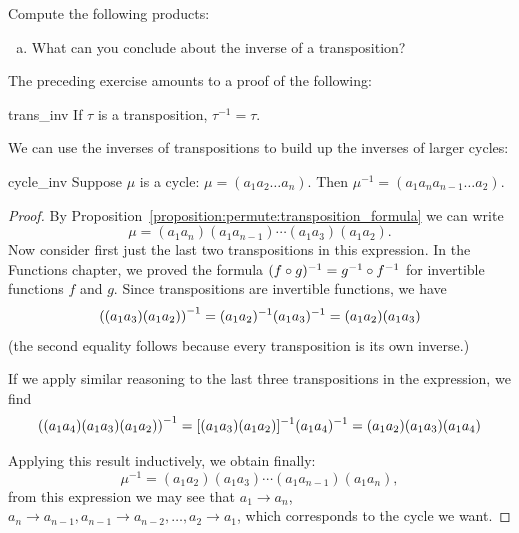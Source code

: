 \begin{exercise}{}
Compute the following products:
\begin{enumerate}[(a)]
\item
What can you conclude about the inverse of a transposition?
\end{enumerate}
\end{exercise}

\noindent
The preceding exercise amounts to a proof of the following:

\begin{prop}{trans_inv}
If $\tau$ is a transposition, $\tau^{-1} = \tau$.
\end{prop}

We can use the inverses of transpositions to build up the inverses of larger cycles:

\begin{prop}{cycle_inv}
Suppose $\mu$ is a cycle: $\mu = (a_1 a_2 \ldots  a_n)$. Then $\mu^{-1} = (a_1 a_n a_{n-1}  \ldots a_2 )$.
\end{prop}

\begin{proof}
By Proposition~\ref{proposition:permute:transposition_formula} we can write 
\[ \mu = (a_1 a_n ) (a_1 a_{n-1} ) \cdots ( a_1 a_3) (a_1 a_2).
\]
Now consider first just the last two transpositions in this expression.
In the Functions chapter, we proved the formula  $(f \circ g)^{-1} = g^{-1} \circ f^{-1}$ for invertible functions $f$ and $g$.
Since transpositions are invertible functions, we have
\[
{\large(}(a_1 a_3)(a_1 a_2){\large)}^{-1} = (a_1 a_2)^{-1} ( a_1 a_3)^{-1} = (a_1 a_2 ) (a_1 a_3 ) \]
(the second equality follows because every transposition is its own inverse.)

If we apply similar reasoning to the last three transpositions in the expression, we find
\[
{\large(}(a_1 a_4)(a_1 a_3)(a_1 a_2){\large)}^{-1} = [(a_1 a_3)(a_1 a_2)]^{-1} ( a_1 a_4)^{-1} = (a_1 a_2 ) (a_1 a_3 ) (a_1 a_4) \]

 Applying this result inductively, we obtain finally: 
\[
\mu^{-1} = (a_1 a_2) ( a_1 a_3) \cdots (a_1 a_{n-1} ) (a_1 a_n ), \]
from this expression we may see that $a_1 \rightarrow a_n$, $a_n \rightarrow a_{n-1}, a_{n-1} \rightarrow a_{n-2}, \ldots, a_{2} \rightarrow a_{1}$, which 
corresponds to the cycle we want.
\end{proof}

